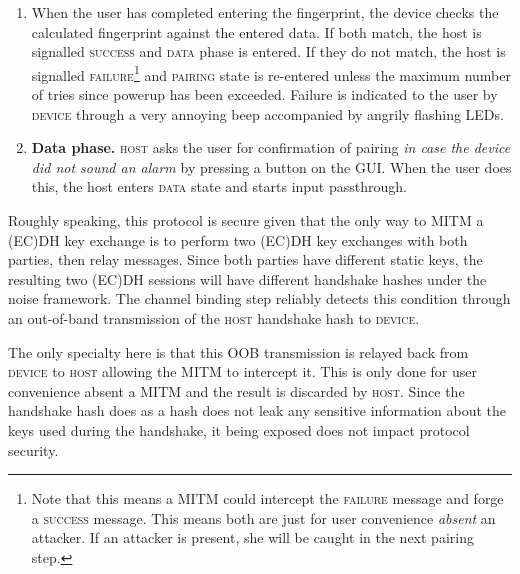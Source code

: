 \documentclass[12pt,a4paper,notitlepage]{article}
\begin{document}
\begin{enumerate}
    field in the pairing GUI. This display is only for user convenience and not relevant to the cryptographic handshake.
    A consequence of this is that a MITM could observe the \emph{fingerprint}\footnote{
        A MITM could also modify the fingerprint information sent from \textsc{device} to \textsc{host}. This would be
        very obvious to the user, since the fingerprint appearing on the \textsc{host} screen would differ from what she
        types.
    }. We show in section \ref{prot_ver} that this does not reduce the protocol's security.
\item When the user has completed entering the fingerprint, the device checks the calculated fingerprint against the
    entered data. If both match, the host is signalled \textsc{success} and \textsc{data} phase is entered. If they do
    not match, the host is signalled \textsc{failure}\footnote{
        Note that this means a MITM could intercept the \textsc{failure} message and forge a \textsc{success} message.
        This means both are just for user convenience \emph{absent} an attacker. If an attacker is present, she will be
        caught in the next pairing step.
    } and \textsc{pairing} state is re-entered unless the maximum number of tries since powerup has been exceeded.
    Failure is indicated to the user by \textsc{device} through a very annoying beep accompanied by angrily flashing
    LEDs.
\item \textbf{Data phase.} \textsc{host} asks the user for confirmation of pairing \emph{in case the device did not
	sound an alarm} by pressing a button on the GUI. When the user does this, the host enters \textsc{data} state and
	starts input passthrough.
\end{enumerate}

Roughly speaking, this protocol is secure given that the only way to MITM a (EC)DH key exchange is to perform two (EC)DH
key exchanges with both parties, then relay messages. Since both parties have different static keys, the resulting two
(EC)DH sessions will have different handshake hashes under the noise framework. The channel binding step reliably
detects this condition through an out-of-band transmission of the \textsc{host} handshake hash to \textsc{device}.

The only specialty here is that this OOB transmission is relayed back from \textsc{device} to \textsc{host} allowing the
MITM to intercept it. This is only done for user convenience absent a MITM and the result is discarded by \textsc{host}.
Since the handshake hash does as a hash does not leak any sensitive information about the keys used during the
handshake, it being exposed does not impact protocol security.
\end{document}
